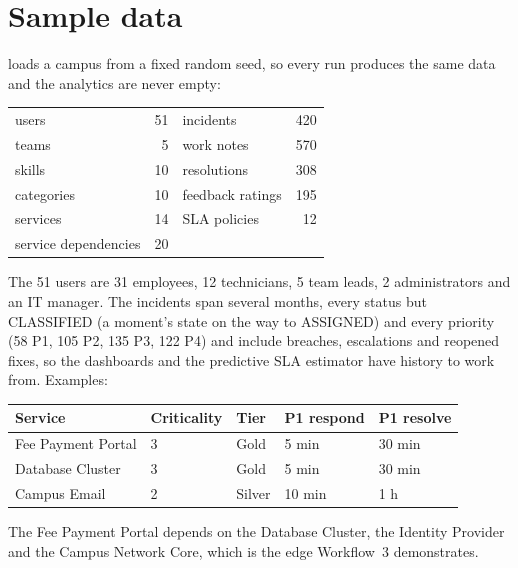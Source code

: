 \section{Sample data}
 loads a campus from a fixed random seed, so every run produces the same data
and the analytics are never empty:
\begin{center}
\begin{tabular}{@{}lr@{\qquad}lr@{}}
\toprule
users & 51 & incidents & 420 \\
teams & 5 & work notes & 570 \\
skills & 10 & resolutions & 308 \\
categories & 10 & feedback ratings & 195 \\
services & 14 & SLA policies & 12 \\
service dependencies & 20 & & \\
\bottomrule
\end{tabular}
\end{center}
The 51 users are 31 employees, 12 technicians, 5 team leads, 2 administrators and an IT
manager. The incidents span several months, every status but CLASSIFIED (a moment's state on the way to
ASSIGNED) and every priority (58 P1, 105 P2, 135 P3,
122 P4) and include breaches, escalations and reopened fixes, so the dashboards and the
predictive SLA estimator have history to work from. Examples:
\begin{center}
\begin{tabular}{@{}lllll@{}}
\toprule
\textbf{Service} & \textbf{Criticality} & \textbf{Tier} & \textbf{P1 respond} & \textbf{P1 resolve} \\
\midrule
Fee Payment Portal & 3 & Gold & 5 min & 30 min \\
Database Cluster & 3 & Gold & 5 min & 30 min \\
Campus Email & 2 & Silver & 10 min & 1 h \\
\bottomrule
\end{tabular}
\end{center}
The Fee Payment Portal depends on the Database Cluster, the Identity Provider and the Campus
Network Core, which is the edge Workflow~3 demonstrates.
